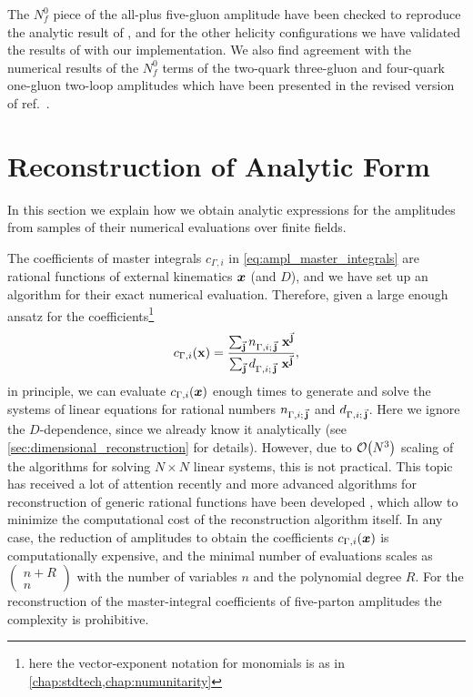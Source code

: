 The $N_f^0$ piece of the all-plus five-gluon amplitude have been
checked to reproduce the analytic result
of \cite{Gehrmann:2015bfy}, and for the other helicity 
configurations we have validated the results of
\cite{Badger:2017jhb} with our implementation.
We also find agreement with the numerical results of the $N_f^0$ terms
of the two-quark three-gluon and four-quark one-gluon two-loop
amplitudes which have been presented in the revised version of
ref.~\cite{Badger:2018gip}.


\section{Reconstruction of Analytic Form}
\label{sec:AnalyticForm}
In this section we explain how we obtain analytic expressions for the amplitudes from samples of their numerical evaluations over finite fields.

The coefficients of master integrals $c_{\Gamma,i}$ in \cref{eq:ampl_master_integrals} are rational
functions of external kinematics $\vb*{x}$ (and $D$), 
and we have set up an algorithm for their exact numerical evaluation.
Therefore, given a large enough ansatz for the coefficients\footnote{
  here the vector-exponent notation for monomials is as in \cref{chap:stdtech,chap:numunitarity}
}
\begin{equation}
  c_{\Gamma,i}(\mathbf{x}) = \frac{\sum_{\va{j}} n_{\Gamma,i;\,\va{j}}~\mathbf{x}^{\va{j}}}{\sum_{\va{j}}d_{\Gamma,i;\,\va{j}} ~ \mathbf{x}^{\va{j}}},
\end{equation}
in principle, we can evaluate $c_{\Gamma,i}(\vb*{x})$ enough times to generate and solve the systems of linear equations
for rational numbers $n_{\Gamma,i;\,\va{j}}$ and  $d_{\Gamma,i;\,\va{j}}$. Here we ignore the $D$-dependence, since
we already know it analytically (see \cref{sec:dimensional_reconstruction} for details).
However, due to $\order{N^3} $ scaling of the algorithms for solving $N\times N$ linear systems, this is not practical.
This topic has received a lot of attention recently and more advanced 
algorithms for reconstruction of generic rational functions have been developed \cite{Peraro:2019svx,Peraro:2016wsq,Klappert:2019emp},
which allow to minimize the computational cost of the reconstruction algorithm itself.
In any case, the reduction of amplitudes to obtain the coefficients $c_{\Gamma,i}(\vb*{x})$ is computationally expensive,
and the minimal number of evaluations scales as $\left(\substack{n+R \\ n }\right)$ with the number of variables $n$ and the
polynomial degree $R$.
For the reconstruction of the master-integral coefficients of five-parton amplitudes the complexity is prohibitive.



